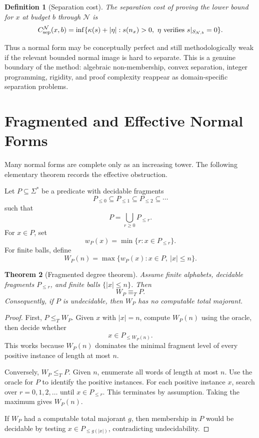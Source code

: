 \documentclass[11pt]{article}
\newtheorem{theorem}{Theorem}[section]
\newtheorem{definition}[theorem]{Definition}
\begin{document}
\begin{definition}[Separation cost]
The separation cost of proving the lower bound for \(x\) at budget \(b\) through \(\mathcal N\) is
\[
C_{\rm sep}^{\mathcal N}(x,b)
=
\inf\{\kappa(s)+|\eta|:
s(n_x)>0,\ \eta\ \text{verifies } s|_{S_{\mathcal N,b}}=0\}.
\]
\end{definition}

Thus a normal form may be conceptually perfect and still methodologically weak if the relevant bounded normal image is hard to separate. This is a genuine boundary of the method: algebraic non-membership, convex separation, integer programming, rigidity, and proof complexity reappear as domain-specific separation problems.

\section{Fragmented and Effective Normal Forms}

Many normal forms are complete only as an increasing tower. The following elementary theorem records the effective obstruction.

Let \(P\subseteq\Sigma^\ast\) be a predicate with decidable fragments
\[
P_{\leq0}\subseteq P_{\leq1}\subseteq P_{\leq2}\subseteq\cdots
\]
such that
\[
P=\bigcup_{r\geq0}P_{\leq r}.
\]
For \(x\in P\), set
\[
w_P(x)=\min\{r:x\in P_{\leq r}\}.
\]
For finite balls, define
\[
W_P(n)=\max\{w_P(x):x\in P,\ |x|\leq n\}.
\]

\begin{theorem}[Fragmented degree theorem]
Assume finite alphabets, decidable fragments \(P_{\leq r}\), and finite balls \(\{|x|\leq n\}\). Then
\[
W_P\equiv_T P.
\]
Consequently, if \(P\) is undecidable, then \(W_P\) has no computable total majorant.
\end{theorem}

\begin{proof}
First, \(P\leq_T W_P\). Given \(x\) with \(|x|=n\), compute \(W_P(n)\) using the oracle, then decide whether
\[
x\in P_{\leq W_P(n)}.
\]
This works because \(W_P(n)\) dominates the minimal fragment level of every positive instance of length at most \(n\).

Conversely, \(W_P\leq_T P\). Given \(n\), enumerate all words of length at most \(n\). Use the oracle for \(P\) to identify the positive instances. For each positive instance \(x\), search over \(r=0,1,2,\ldots\) until \(x\in P_{\leq r}\). This terminates by assumption. Taking the maximum gives \(W_P(n)\).

If \(W_P\) had a computable total majorant \(g\), then membership in \(P\) would be decidable by testing \(x\in P_{\leq g(|x|)}\), contradicting undecidability.
\end{proof}
\end{document}
